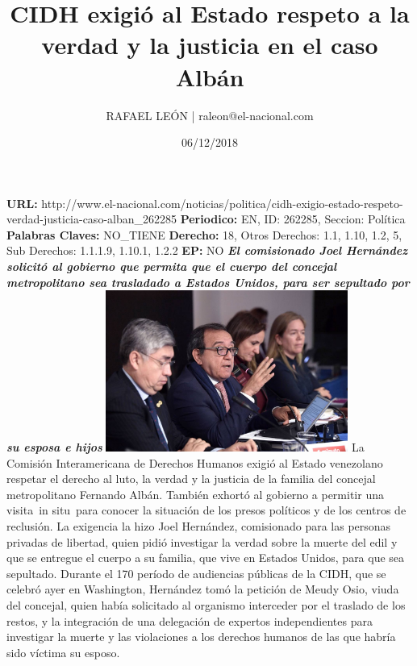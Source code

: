 \documentclass{article}%
\title{\textbf{CIDH exigió al Estado respeto a la verdad y la justicia en el caso Albán}}%
\author{RAFAEL LEÓN | raleon@el{-}nacional.com}%
\date{06/12/2018}%
\begin{document}
%
\normalsize%
\maketitle%
\textbf{URL: }%
http://www.el{-}nacional.com/noticias/politica/cidh{-}exigio{-}estado{-}respeto{-}verdad{-}justicia{-}caso{-}alban\_262285\newline%
%
\textbf{Periodico: }%
EN, %
ID: %
262285, %
Seccion: %
Política\newline%
%
\textbf{Palabras Claves: }%
NO\_TIENE\newline%
%
\textbf{Derecho: }%
18, %
Otros Derechos: %
1.1, 1.10, 1.2, 5, %
Sub Derechos: %
1.1.1.9, 1.10.1, 1.2.2\newline%
%
\textbf{EP: }%
NO\newline%
\newline%
%
\textbf{\textit{El comisionado Joel Hernández solicitó al gobierno que permita que el cuerpo del concejal metropolitano sea trasladado a Estados Unidos, para ser sepultado por su esposa e hijos}}%
\newline%
\newline%
%
\includegraphics[width=300px]{232.jpg}%
\newline%
%
La Comisión Interamericana de Derechos Humanos exigió al Estado venezolano respetar el derecho al luto, la verdad y la justicia de la familia del concejal metropolitano Fernando Albán. También exhortó al gobierno a permitir una visita~in situ~para conocer la situación de los presos políticos y de los centros de reclusión.%
\newline%
%
La exigencia la hizo Joel Hernández, comisionado para las personas privadas de libertad, quien pidió investigar la verdad sobre la muerte del edil y que se entregue el cuerpo a su familia, que vive en Estados Unidos, para que sea sepultado.%
\newline%
%
Durante el 170 período de audiencias públicas de la CIDH, que se celebró ayer en Washington, Hernández tomó la petición de Meudy Osio, viuda del concejal, quien había solicitado al organismo interceder por el traslado de los restos, y la integración de una delegación de expertos independientes para investigar la muerte y las violaciones a los derechos humanos de las que habría sido víctima su esposo.%
\end{document}
